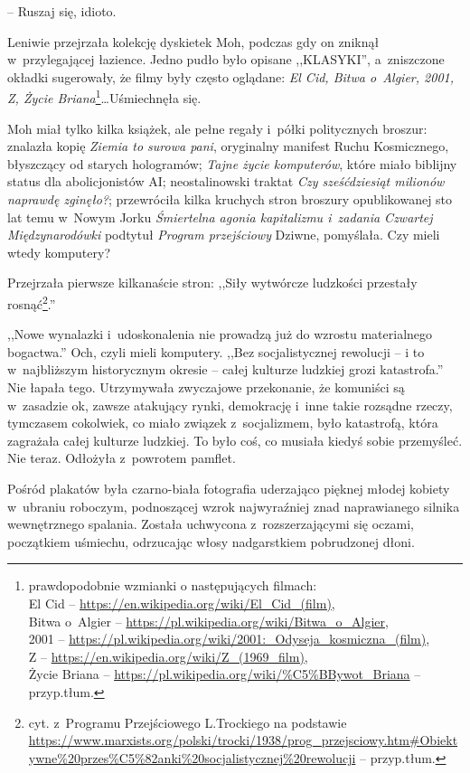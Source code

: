 \documentclass[oneside,polish,11pt,sfheadings]{mwbk}
\begin{document}
-- Ruszaj się, idioto.

Leniwie przejrzała kolekcję dyskietek Moh, podczas gdy on zniknął w~przylegającej łazience. Jedno pudło było opisane ,,KLASYKI'', a~zniszczone
okładki sugerowały, że filmy były często oglądane: \emph{El Cid, Bitwa o~Algier, 2001, Z, Życie Briana}\footnote{prawdopodobnie wzmianki o następujących filmach:\\ El Cid -- \url{https://en.wikipedia.org/wiki/El_Cid_(film)},\\ Bitwa o~Algier -- \url{https://pl.wikipedia.org/wiki/Bitwa_o_Algier},\\ 2001 -- \url{https://pl.wikipedia.org/wiki/2001:_Odyseja_kosmiczna_(film)},\\ Z -- \url{https://en.wikipedia.org/wiki/Z_(1969_film)},\\ Życie Briana -- \url{https://pl.wikipedia.org/wiki/\%C5\%BBywot_Briana} -- przyp.tłum.}\ldots Uśmiechnęła się.

Moh miał tylko kilka książek, ale pełne regały i~półki politycznych
broszur: znalazła kopię \emph{Ziemia to surowa pani}, oryginalny
manifest Ruchu Kosmicznego, błyszczący od starych hologramów;
\emph{Tajne życie komputerów}, które miało biblijny status dla
abolicjonistów AI; neostalinowski traktat \emph{Czy sześćdziesiąt
milionów naprawdę zginęło?}; przewróciła kilka kruchych stron broszury
opublikowanej sto lat temu w~Nowym Jorku \emph{Śmiertelna agonia
kapitalizmu i~zadania Czwartej Międzynarodówki} podtytuł \emph{Program
przejściowy} Dziwne, pomyślała. Czy mieli wtedy
komputery?

Przejrzała pierwsze kilkanaście stron: ,,Siły wytwórcze ludzkości
przestały rosnąć\footnote{cyt. z~Programu Przejściowego L.Trockiego na
podstawie
\url{https://www.marxists.org/polski/trocki/1938/prog\_przejsciowy.htm\#Obiektywne\%20przes\%C5\%82anki\%20socjalistycznej\%20rewolucji} -- przyp.tłum.}.'' 

,,Nowe wynalazki i~udoskonalenia nie prowadzą już do wzrostu materialnego
bogactwa.'' Och, czyli mieli komputery. ,,Bez socjalistycznej rewolucji -- i to w~najbliższym historycznym okresie -- całej kulturze ludzkiej grozi
katastrofa.'' Nie łapała tego. Utrzymywała zwyczajowe przekonanie, że
komuniści są w~zasadzie ok, zawsze atakujący rynki, demokrację i~inne
takie rozsądne rzeczy, tymczasem cokolwiek, co miało związek z~socjalizmem, było katastrofą, która zagrażała całej kulturze ludzkiej.
To było coś, co musiała kiedyś sobie przemyśleć. Nie teraz. Odłożyła z~powrotem pamflet.

Pośród plakatów była czarno-biała fotografia uderzająco pięknej młodej
kobiety w~ubraniu roboczym, podnoszącej wzrok najwyraźniej znad
naprawianego silnika wewnętrznego spalania. Została uchwycona z~rozszerzającymi się oczami, początkiem uśmiechu, odrzucając włosy
nadgarstkiem pobrudzonej dłoni.
\end{document}
